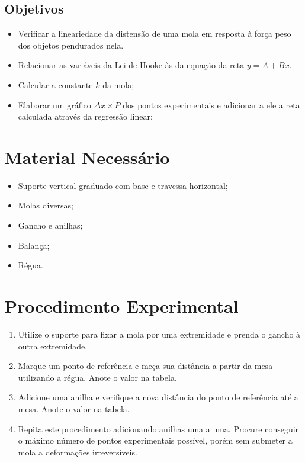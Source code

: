 \subsection{Objetivos}

\begin{itemize}
     \item Verificar a lineariedade da distensão de uma mola em resposta à força peso dos objetos pendurados nela.
	 \item Relacionar as variáveis da Lei de Hooke às da equação da reta $y = A + Bx$.
     \item Calcular a constante $k$ da mola;
     \item Elaborar um gráfico $\Delta x \times P$ dos pontos experimentais e adicionar a ele a reta calculada através da regressão linear;
\end{itemize}

\section{Material Necessário}

\begin{itemize}
	\item Suporte vertical graduado com base e travessa horizontal;
	\item Molas diversas;
	\item Gancho e anilhas;
	\item Balança;
	\item Régua.
\end{itemize}

\section{Procedimento Experimental}

\begin{enumerate}
	\item Utilize o suporte para fixar a mola por uma extremidade e prenda o gancho à outra extremidade.
	\item Marque um ponto de referência e meça sua distância a partir da mesa utilizando a régua. Anote o valor na tabela.
	\item Adicione uma anilha e verifique a nova distância do ponto de referência até a mesa. Anote o valor na tabela.
	\item Repita este procedimento adicionando anilhas uma a uma. Procure conseguir o máximo número de pontos experimentais possível, porém sem submeter a mola a deformações irreversíveis.
\end{enumerate}


